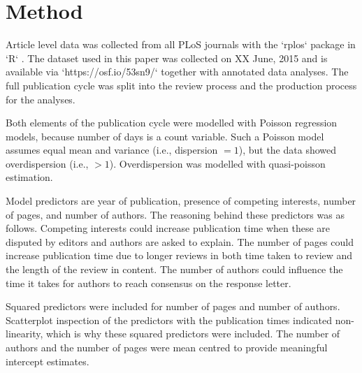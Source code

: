 \section*{Method}
Article level data was collected from all PLoS journals with the `rplos` package \cite[v0.4.7][]{rplos} in `R` \cite[v3.2.0][]{rcran}. The dataset used in this paper was collected on XX June, 2015 and is available via `https://osf.io/53sn9/` together with annotated data analyses. The full publication cycle was split into the review process and the production process for the analyses.

Both elements of the publication cycle were modelled with Poisson regression models, because number of days is a count variable. Such a Poisson model assumes equal mean and variance (i.e., dispersion $=1$), but the data showed overdispersion (i.e., $>1$). Overdispersion was modelled with quasi-poisson estimation.

Model predictors are year of publication, presence of competing interests, number of pages, and number of authors. The reasoning behind these predictors was as follows. Competing interests could increase publication time when these are disputed by editors and authors are asked to explain. The number of pages could increase publication time due to longer reviews in both time taken to review and the length of the review in content. The number of authors could influence the time it takes for authors to reach consensus on the response letter. 

Squared predictors were included for number of pages and number of authors. Scatterplot inspection of the predictors with the publication times indicated non-linearity, which is why these squared predictors were included. The number of authors and the number of pages were mean centred to provide meaningful intercept estimates.